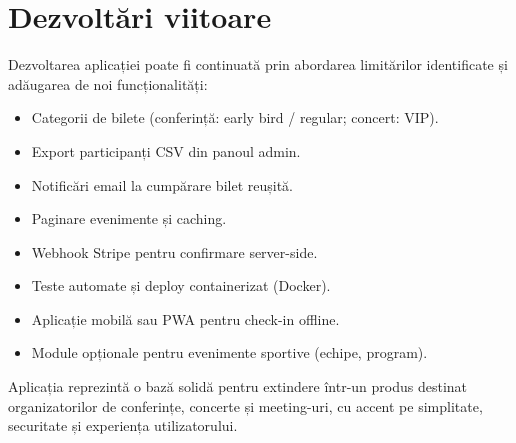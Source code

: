 \section{Dezvoltări viitoare}

Dezvoltarea aplicației poate fi continuată prin abordarea limitărilor identificate și adăugarea de noi funcționalități:

\begin{itemize}
	\item Categorii de bilete (conferință: early bird / regular; concert: VIP).
	\item Export participanți CSV din panoul admin.
	\item Notificări email la cumpărare bilet reușită.
	\item Paginare evenimente și caching.
	\item Webhook Stripe pentru confirmare server-side.
	\item Teste automate și deploy containerizat (Docker).
	\item Aplicație mobilă sau PWA pentru check-in offline.
	\item Module opționale pentru evenimente sportive (echipe, program).
\end{itemize}

Aplicația reprezintă o bază solidă pentru extindere într-un produs destinat organizatorilor de conferințe, concerte și meeting-uri, cu accent pe simplitate, securitate și experiența utilizatorului.